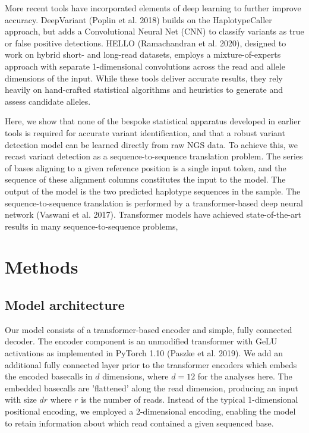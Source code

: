 \documentclass[]{article}
\begin{document}
More recent tools have incorporated elements of deep learning to further improve accuracy. DeepVariant (Poplin et al. 2018) builds on the HaplotypeCaller approach, but adds a Convolutional Neural Net (CNN) to classify variants as true or false positive detections. HELLO (Ramachandran et al. 2020), designed to work on hybrid short- and long-read datasets, employs a mixture-of-experts approach with separate 1-dimensional convolutions across the read and allele dimensions of the input. While these tools deliver accurate results, they rely heavily on hand-crafted statistical algorithms and heuristics to generate and assess candidate alleles. 


Here, we show that none of the bespoke statistical apparatus developed in earlier tools is required for accurate variant identification, and that a robust variant detection model can be learned directly from raw NGS data. To achieve this, we recast variant detection as a sequence-to-sequence translation problem. The series of bases aligning to a given reference position is a single input token, and the sequence of these alignment columns constitutes the input to the model. The output of the model is the two predicted haplotype sequences in the sample. The sequence-to-sequence translation is performed by a transformer-based deep neural network (Vaswani et al. 2017). Transformer models have achieved state-of-the-art results in many sequence-to-sequence problems, 


\section{Methods}

\subsection{Model architecture}

Our model consists of a transformer-based encoder and simple, fully connected decoder. The encoder component is an unmodified transformer with GeLU activations as implemented in PyTorch 1.10 (Paszke et al. 2019). We add an additional fully connected layer prior to the transformer encoders which embeds the encoded basecalls in $d$ dimensions, where $d=12$ for the analyses here. The embedded basecalls are 'flattened' along the read dimension, producing an input with size $dr$ where $r$ is the number of reads. Instead of the typical 1-dimensional positional encoding, we employed a 2-dimensional encoding, enabling the model to retain information about which read contained a given sequenced base. 
\end{document}
